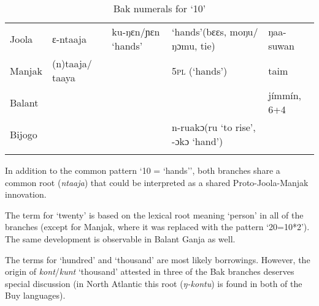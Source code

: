 \newpage 
{}

\begin{table}
\caption{\label{tab:3:246}Bak numerals for `10'}


\begin{tabularx}{\textwidth}{lQQQl}
\lsptoprule

{Joola} & ɛ-ntaaja\footnotemark{} & ku-ŋɛn/ɲɛn `hands' & `hands'\newline (bɛɛs, moŋu/ŋɔmu, tie) & ŋaa-suwan\\
{Manjak} & (n)taaja/ taaya &  & 5\textsc{pl} (‘hands’) & taim\\
{Balant} &  &  &  & jímmín, 6+4\\
{Bijogo} &  &  & n-ruakɔ\newline (ru ‘to rise’, -ɔkɔ ‘hand’) & \\
\lspbottomrule
\end{tabularx}
\end{table}

In addition to the common pattern ‘10 = ‘hands’’, both branches share a common root (\textit{ntaaja}) that could be interpreted as a shared Proto-Joola-Manjak innovation.


The term for ‘twenty’ is based on the lexical root meaning ‘person’ in all of the branches (except for Manjak, where it was replaced with the pattern ‘20=10*2’). The same development is observable in Balant Ganja as well.

The terms for ‘hundred’ and ‘thousand’ are most likely borrowings. However, the origin of \textit{kont}/\textit{kunt} ‘thousand’ attested in three of the Bak branches deserves special discussion (in North Atlantic this root (\textit{ŋ-kontu}) is found in both of the Buy languages).

\newpage 
{}

